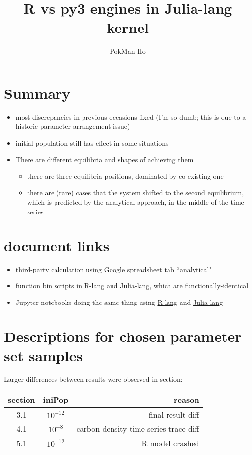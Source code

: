 \documentclass[a4paper,11pt]{article}
\title{R vs py3 engines in Julia-lang kernel}
\author{PokMan Ho}
\begin{document}
    \maketitle
    \section{Summary}
    \begin{itemize}
        \item most discrepancies in previous occasions fixed (I'm so dumb; this is due to a historic parameter arrangement issue)
        \item initial population still has effect in some situations
        \item There are different equilibria and shapes of achieving them
        \begin{itemize}
            \item there are three equilibria positions, dominated by co-existing one
            \item there are (rare) cases that the system shifted to the second equilibrium, which is predicted by the analytical approach, in the middle of the time series
        \end{itemize}
    \end{itemize}
    
    \section{document links}
    \begin{itemize}
        \item third-party calculation using Google  \href{https://docs.google.com/spreadsheets/d/1k4eZ2qmefPx8dAj6BVPFUE00JBayk8zqMAfbH60slB8/edit#gid=939440998}{spreadsheet} tab ``analytical"
        \item function bin scripts in \href{https://github.com/ph-u/Project/blob/master/code/func.R}{R-lang} and \href{https://github.com/ph-u/Project/blob/master/code/func.jl}{Julia-lang}, which are functionally-identical
        \item Jupyter notebooks doing the same thing using \href{https://nbviewer.jupyter.org/github/ph-u/Project/blob/master/sandbox/cpb_0514_r.ipynb}{R-lang} and \href{https://nbviewer.jupyter.org/github/ph-u/Project/blob/master/sandbox/cpb_0514_jp.ipynb}{Julia-lang}
    \end{itemize}
    
    \section{Descriptions for chosen parameter set samples}
    Larger differences between results were observed in section:
    
    \begin{tabular}{cc|r}\hline
    section & iniPop & reason\\\hline
        3.1 & $10^{-12}$ & final result diff\\
        4.1 & $10^{-8}$ & carbon density time series trace diff\\
        5.1 & $10^{-12}$ & R model crashed\\\hline
    \end{tabular}
\end{document}
